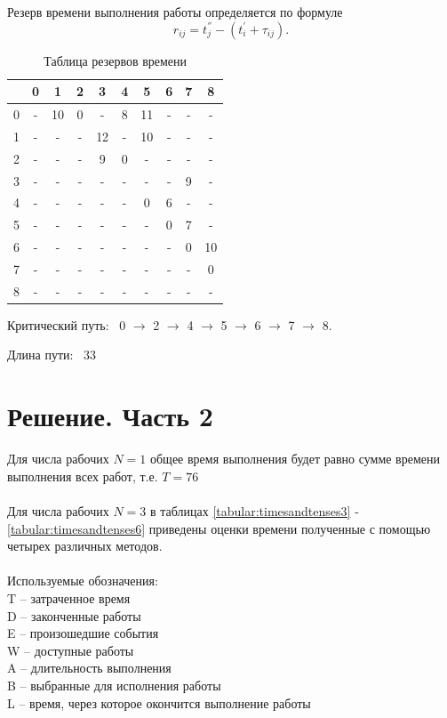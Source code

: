 \documentclass[a4paper,14pt]{extarticle}
\begin{document}
Резерв времени выполнения работы определяется по формуле
$$r_{ij} = t^{''}_{j} - (t^{'}_{i} + \tau_{ij}).$$

\begin{table}[H]
\caption{Таблица резервов времени}
\label{tabular:timesandtenses2}
\begin{center}
\begin{tabular}{|c|c|c|c|c|c|c|c|c|c|}
\hline
  & 0 & 1 & 2 & 3 & 4 & 5 & 6 & 7 & 8\\ \hline
0 & - & 10 & 0 & - & 8 & 11 & - & - & -\\ \hline
1 & - & - & - & 12 & - & 10 & - & - & -\\ \hline
2 & - & - & - & 9 & 0 & - & - & - & -\\ \hline
3 & - & - & - & - & - & - & - & 9 & -\\ \hline
4 & - & - & - & - & - & 0 & 6 & - & -\\ \hline
5 & - & - & - & - & - & - & 0 & 7 & -\\ \hline
6 & - & - & - & - & - & - & - & 0 & 10\\ \hline
7 & - & - & - & - & - & - & - & - & 0\\ \hline
8 & - & - & - & - & - & - & - & - & -\\ \hline
\end{tabular}
\end{center}
\end{table}

Критический путь: \ 0 $\rightarrow$ 2 $\rightarrow$ 4 $\rightarrow$ 5 $\rightarrow$ 6 $\rightarrow$ 7 $\rightarrow$ 8.

Длина пути: \ 33

\section{Решение. Часть 2}

Для числа рабочих $N = 1$ общее время выполнения будет равно сумме времени выполнения всех работ, т.е. $T = 76$ \\\\
Для числа рабочих $N = 3$ в таблицах \ref{tabular:timesandtenses3} - \ref{tabular:timesandtenses6} приведены оценки времени полученные с помощью четырех различных методов. \\\\
Используемые обозначения: \\
T -- затраченное время \\
D -- законченные работы \\
E -- произошедшие события \\
W -- доступные работы \\
A -- длительность выполнения  \\
B -- выбранные для исполнения работы \\
L -- время, через которое окончится выполнение работы
\end{document}

